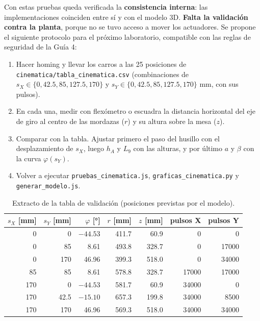 \documentclass[a4paper,12pt]{article}
\newcommand{\codigo}[1]{\texttt{\small #1}}
\begin{document}
Con estas pruebas queda verificada la \textbf{consistencia interna}: las implementaciones coinciden entre
sí y con el modelo 3D. \textbf{Falta la validación contra la planta}, porque no se tuvo acceso a mover los
actuadores. Se propone el siguiente protocolo para el próximo laboratorio, compatible con las reglas de
seguridad de la Guía 4:
\begin{enumerate}
\item Hacer homing y llevar los carros a las 25 posiciones de \codigo{cinematica/tabla\_cinematica.csv}
      (combinaciones de $s_X \in \{0, 42.5, 85, 127.5, 170\}$ y $s_Y \in \{0, 42.5, 85, 127.5, 170\}$ mm, con sus pulsos).
\item En cada una, medir con flexómetro o escuadra la distancia horizontal del eje de giro al centro de las
      mordazas ($r$) y su altura sobre la mesa ($z$).
\item Comparar con la tabla. Ajustar primero el paso del husillo con el desplazamiento de $s_X$, luego $h_A$
      y $L_9$ con las alturas, y por último $a$ y $\beta$ con la curva $\varphi(s_Y)$.
\item Volver a ejecutar \codigo{pruebas\_cinematica.js}, \codigo{graficas\_cinematica.py} y
      \codigo{generar\_modelo.js}.
\end{enumerate}

\begin{table}[H]
\centering\small
\begin{tabular}{@{}rrrrrrr@{}}
\toprule
$s_X$ [mm] & $s_Y$ [mm] & $\varphi$ [°] & $r$ [mm] & $z$ [mm] & pulsos X & pulsos Y\\
\midrule
0 & 0 & $-44.53$ & 411.7 & 60.9 & 0 & 0\\
0 & 85 & 8.61 & 493.8 & 328.7 & 0 & 17000\\
0 & 170 & 46.96 & 399.3 & 518.0 & 0 & 34000\\
85 & 85 & 8.61 & 578.8 & 328.7 & 17000 & 17000\\
170 & 0 & $-44.53$ & 581.7 & 60.9 & 34000 & 0\\
170 & 42.5 & $-15.10$ & 657.3 & 199.8 & 34000 & 8500\\
170 & 170 & 46.96 & 569.3 & 518.0 & 34000 & 34000\\
\bottomrule
\end{tabular}
\caption{Extracto de la tabla de validación (posiciones previstas por el modelo).}
\end{table}

\end{document}
